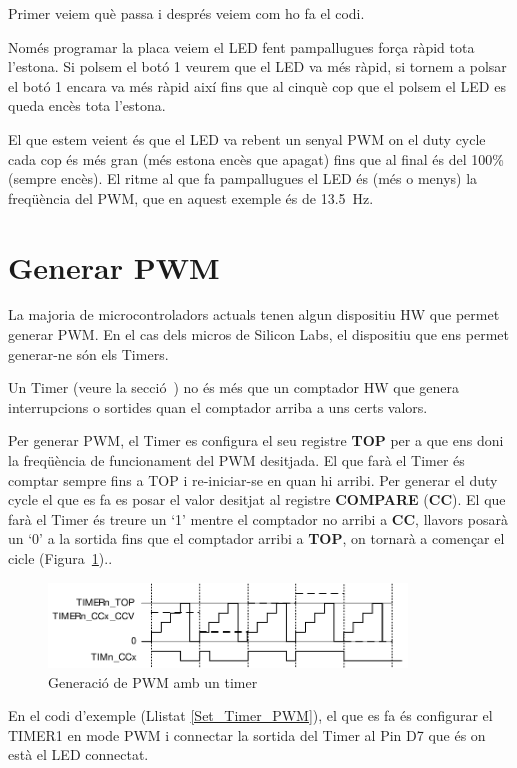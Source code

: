 Primer veiem què passa i després veiem com ho fa el codi.

Només programar la placa veiem el LED fent pampallugues força ràpid tota l'estona. Si polsem el botó 1 veurem que el LED va més ràpid, si tornem a polsar el botó 1 encara va més ràpid així fins que al cinquè cop que el polsem el LED es queda encès tota l'estona.

El que estem veient és que el LED va rebent un senyal PWM on el duty cycle cada cop és més gran (més estona encès que apagat) fins que al final és del 100\% (sempre encès). El ritme al que fa pampallugues el LED és (més o menys) la freqüència del PWM, que en aquest exemple és de 13.5~Hz.

\section{Generar PWM}
\label{sub:PWM_example}

La majoria de microcontroladors actuals tenen algun dispositiu HW que permet generar \gls{PWM}. En el cas dels micros de Silicon Labs, el dispositiu que ens permet generar-ne són els \glspl{Timer}.

Un Timer (veure la secció~) no és més que un comptador HW que genera interrupcions o sortides quan el comptador arriba a uns certs valors.

Per generar PWM, el Timer es configura el seu registre {\bf TOP} per a que ens doni la freqüència de funcionament del PWM desitjada. El que farà el Timer és comptar sempre fins a TOP i re-iniciar-se en quan hi arribi. Per generar el \gls{duty cycle} el que es fa es posar el valor desitjat al registre {\bf COMPARE} ({\bf CC}). El que farà el Timer és treure un ‘1' mentre el comptador no arribi a {\bf CC}, llavors posarà un ‘0' a la sortida fins que el comptador arribi a {\bf TOP}, on tornarà a començar el cicle (Figura~\ref{fig:pwm_timer})..

\begin{figure}
 \centering
 \includegraphics[width=0.85\textwidth, keepaspectratio]{imatges/pwm_timer.png}
 \caption{Generació de PWM amb un timer \cite[262]{EFM32GRM}}
 \label{fig:pwm_timer}
\end{figure}
En el codi d'exemple (Llistat \ref{Set_Timer_PWM}), el que es fa és configurar el TIMER1 en mode PWM i connectar la sortida del Timer al Pin D7 que és on està el LED connectat.

